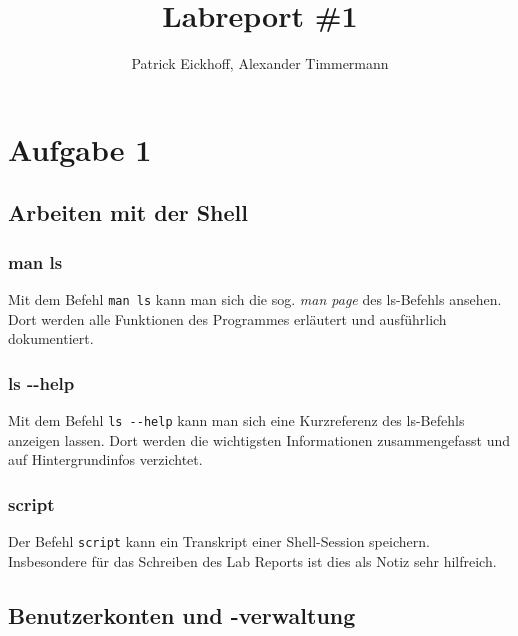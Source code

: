 \documentclass{scrartcl}
\author{Patrick Eickhoff, Alexander Timmermann}
\title{Labreport \#1}
\begin{document}
    \maketitle
    \section*{Aufgabe 1}
    \label{sec:Aufgabe 1}

    \subsection{Arbeiten mit der Shell}
    \label{sub:Arbeiten mit der Shell}

    \subsubsection{man ls}
    \label{subs:man ls}
        Mit dem Befehl \texttt{man ls} kann man sich die sog. \textit{man page}
        des ls-Befehls ansehen. Dort werden alle Funktionen des Programmes erläutert
        und ausführlich dokumentiert.

    \subsubsection{ls \--\--help}
    \label{subs:ls --help}
        Mit dem Befehl \texttt{ls \--\--help} kann man sich eine Kurzreferenz des
        ls-Befehls anzeigen lassen. Dort werden die wichtigsten Informationen
        zusammengefasst und auf Hintergrundinfos verzichtet.

    \subsubsection{script}
    \label{subs:script}
        Der Befehl \texttt{script} kann ein Transkript einer Shell-Session
        speichern. Insbesondere für das Schreiben des Lab Reports ist dies
        als Notiz sehr hilfreich.

    \subsection{Benutzerkonten und -verwaltung}
    \label{sub:Benutzerkonten und -verwaltung}
\end{document}
